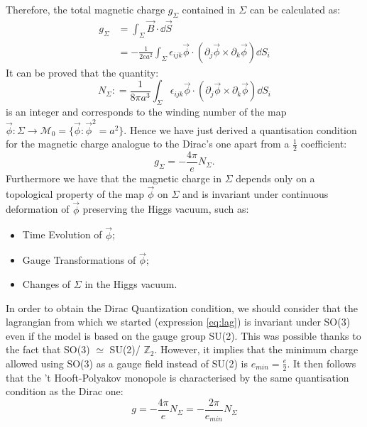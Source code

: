 \documentclass[main.tex]{subfiles}
\begin{document}
Therefore, the total magnetic charge $g_\Sigma$ contained in $\Sigma$ can be  calculated as: 
\begin{equation}
\begin{split}
g_\Sigma &= \int_\Sigma \vec{B} \cdot \dd{\vec{S}}  \\
         &= - \frac{1}{2ea^2}\int_\Sigma  \epsilon_{ijk} \vec{\phi} \cdot \left(  \partial_j\vec{\phi} \times \partial_k \vec{\phi}  \right) \dd{S_i}
\end{split}
\end{equation} 
It can be proved that the quantity:
\begin{equation}
N_\Sigma : = \frac{1}{8 \pi a^3} \int_\Sigma  \epsilon_{ijk} \vec{\phi} \cdot \left(  \partial_j\vec{\phi} \times \partial_k \vec{\phi}  \right) \dd{S_i}
\end{equation}
is an integer and corresponds to the winding number of the map $\vec{\phi} \colon \Sigma \to \mathcal{M}_0 = \{ \vec{\phi} : \vec{\phi}^2 = a^2 \}$. 
Hence we have just derived a quantisation condition for the magnetic charge analogue to the Dirac's one apart from a $\frac{1}{2}$ coefficient: 
\begin{equation}
g_\Sigma = -\frac{4 \pi}{e} N_\Sigma.
\end{equation}
Furthermore we have that the magnetic charge in $\Sigma$ depends only on  a topological property of the map $\vec{\phi}$ on $\Sigma$ and is invariant under continuous deformation of $\vec{\phi}$ preserving the Higgs vacuum, such as:
\begin{itemize}
    \item Time Evolution of $\vec{\phi}$;
    \item Gauge Transformations of $\vec{\phi}$;
    \item Changes of $\Sigma$ in the Higgs vacuum.
\end{itemize}
In order to obtain the Dirac Quantization condition, we should consider that the lagrangian from which we started (expression \ref{eq:lag}) is invariant under SO(3) even if the model is based on the gauge group SU(2). This was possible thanks to the fact that SO(3) $ \simeq$ SU(2)/ $\mathbb{Z}_2$. However, it implies that the minimum charge allowed using SO(3) as a gauge field instead of SU(2) is $ e_{min} =\frac{e}{2}$.
It then follows that the 't Hooft-Polyakov monopole is characterised by the same quantisation condition as the Dirac one: 
\begin{equation}
g = - \frac{4 \pi}{ e} N_\Sigma= - \frac{2 \pi}{ e_{min}} N_\Sigma
\end{equation}
\end{document}
